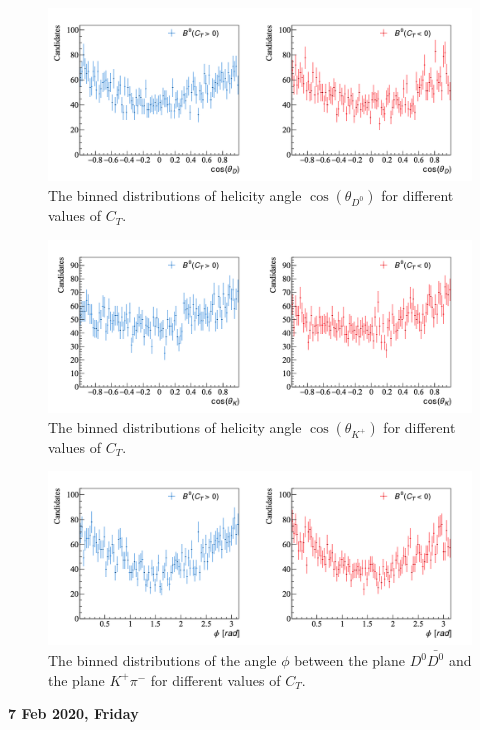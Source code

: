 \begin{figure}[h]
\center
\includegraphics*[width=0.96\linewidth]{CM_variables_B0/B0_helangle_D0Dbar0_10000}
\caption{The binned distributions of helicity angle $\cos(\theta_{D^0})$ for different values of $C_T$.}
\label{thetaddv3}
\end{figure}
\begin{figure}[h]
\center
\includegraphics*[width=0.96\linewidth]{CM_variables_B0/B0_helangle_KpPim_10000}
\caption{The binned distributions of helicity angle $\cos(\theta_{K^+})$ for different values of $C_T$.}
\label{thetakpiv3}
\end{figure}
\begin{figure}[h]
\center
\includegraphics*[width=0.96\linewidth]{CM_variables_B0/B0_planeangle_10000}
\caption{The binned distributions of the angle $\phi$ between the plane $D^0\bar{D^0}$ and the plane $K^+\pi^-$ for different values of $C_T$.}
\label{phiv3}
\end{figure}
\clearpage
\noindent\textbf{7 Feb 2020, Friday}
